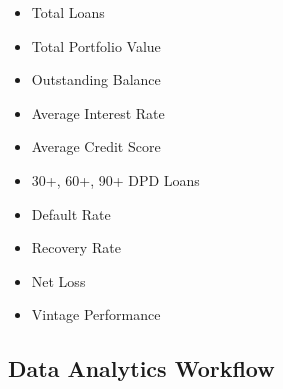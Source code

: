 \begin{tcolorbox}[colback=LightBlue,colframe=PrimaryBlue,title=Power BI Dashboard KPIs]
	
	\begin{itemize}
		
		\item Total Loans
		
		\item Total Portfolio Value
		
		\item Outstanding Balance
		
		\item Average Interest Rate
		
		\item Average Credit Score
		
		\item 30+, 60+, 90+ DPD Loans
		
		\item Default Rate
		
		\item Recovery Rate
		
		\item Net Loss
		
		\item Vintage Performance
		
	\end{itemize}
	
\end{tcolorbox}


\subsection*{Data Analytics Workflow}

\begin{center}
	
	
\end{center}